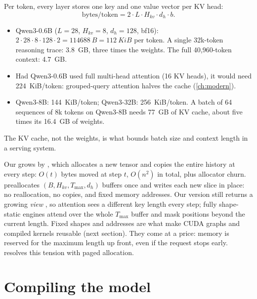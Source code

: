 \begin{napkinmath}
Per token, every layer stores one key and one value vector per KV head:
\begin{equation}\label{eq:inference:kvbytes}
  \text{bytes/token} = 2 \cdot L \cdot H_{kv} \cdot d_h \cdot b .
\end{equation}
\begin{itemize}
  \item Qwen3-0.6B ($L{=}28$, $H_{kv}{=}8$, $d_h{=}128$, bf16): $2\cdot28\cdot8\cdot128\cdot2=\SI{114688}{B}=\SI{112}{KiB}$
    per token. A single 32k-token reasoning trace: \SI{3.8}{GB}, three times the weights. The full
    40,960-token context: \SI{4.7}{GB}.
  \item Had Qwen3-0.6B used full multi-head attention (16 KV heads), it would need \SI{224}{KiB}/token:
    grouped-query attention halves the cache (\cref{ch:modern}).
  \item Qwen3-8B: \SI{144}{KiB}/token; Qwen3-32B: \SI{256}{KiB}/token. A batch of 64 sequences of 8k
    tokens on Qwen3-8B needs \SI{77}{GB} of KV cache, about five times its \SI{16.4}{GB} of weights.
\end{itemize}
The KV cache, not the weights, is what bounds batch size and context length in a serving system.
\end{napkinmath}

\begin{systemslens}
Our  grows by , which allocates a new tensor and copies the entire
history at every step: $O(t)$ bytes moved at step $t$, $O(n^2)$ in total, plus allocator churn.
 preallocates $(B,H_{kv},T_{\max},d_h)$ buffers once and writes each new
slice in place: no reallocation, no copies, and fixed memory addresses. Our version still returns a
growing \emph{view} \code{[:, :, :end]}, so attention sees a different key length every step; fully
shape-static engines attend over the whole $T_{\max}$ buffer and mask positions beyond the current
length. Fixed shapes and addresses are what make CUDA graphs and compiled kernels reusable (next section). They come at a price:
memory is reserved for the maximum length up front, even if the request stops early.
 resolves this tension with paged allocation.
\end{systemslens}

\section{Compiling the model}\label{sec:inference:compile}

